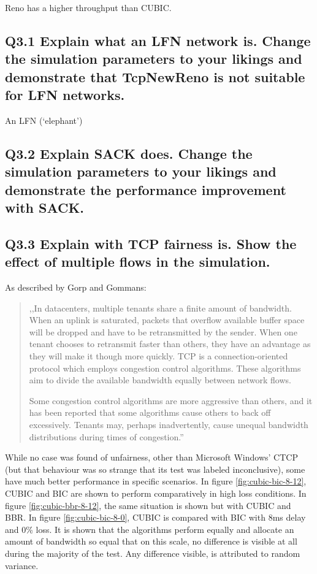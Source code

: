 \documentclass{article}
\begin{document}
Reno has a higher throughput than CUBIC.


\subsection{Q3.1 Explain what an LFN network is. Change the simulation parameters to your likings and demonstrate that TcpNewReno is not suitable for LFN networks.}

An LFN (`elephant') 


\subsection{Q3.2 Explain SACK does. Change the simulation parameters to your likings and demonstrate the performance improvement with SACK.}




\subsection{Q3.3 Explain with TCP fairness is. Show the effect of multiple flows in the simulation.}

As described by Gorp and Gommans\cite{gg}:

\begin{quote}
	,,In datacenters, multiple tenants share a finite amount of bandwidth. When an uplink
	is saturated, packets that overflow available buffer space will be dropped and have to
	be retransmitted by the sender. When one tenant chooses to retransmit faster than
	others, they have an advantage as they will make it though more quickly. TCP is
	a connection-oriented protocol which employs congestion control algorithms. These
	algorithms aim to divide the available bandwidth equally between network flows.

	Some congestion control algorithms are more aggressive than others, and it has been
	reported that some algorithms cause others to back off excessively. Tenants may,
	perhaps inadvertently, cause unequal bandwidth distributions during times of congestion.''
\end{quote}

While no case was found of unfairness, other than Microsoft Windows' CTCP (but
that behaviour was so strange that its test was labeled inconclusive), some
have much better performance in specific scenarios. In figure
\ref{fig:cubic-bic-8-12}, CUBIC and BIC are shown to perform comparatively in
high loss conditions. In figure \ref{fig:cubic-bbr-8-12}, the same situation is
shown but with CUBIC and BBR. In figure \ref{fig:cubic-bic-8-0}, CUBIC is
compared with BIC with 8ms delay and 0\% loss. It is shown that the algorithms
perform equally and allocate an amount of bandwidth so equal that on this
scale, no difference is visible at all during the majority of the test. Any
difference visible, is attributed to random variance.
\end{document}
